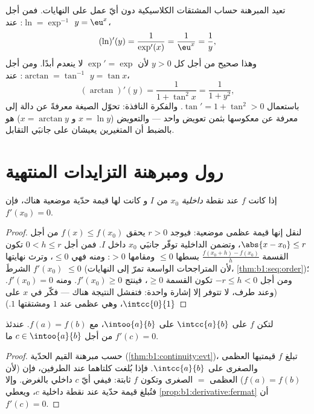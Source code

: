 \begin{example}\label{ex:b1:derivative:inverseaction}
تعيد المبرهنة حساب المشتقات الكلاسيكية دون أيّ عمل على
النهايات. فمن أجل $\ln = \exp^{-1}$: عند $y = \eu^x$،
\[
(\ln)'(y) = \frac{1}{\exp'(x)} = \frac{1}{\eu^{x}} = \frac1y ,
\]
وهذا صحيح من أجل كل $y > 0$ لأن $\exp' = \exp$ لا ينعدم أبدًا. ومن أجل
$\arctan = \tan^{-1}$: عند $y = \tan x$،
\[
(\arctan)'(y) = \frac{1}{1 + \tan^2 x} = \frac{1}{1 + y^2} ,
\]
باستعمال $\tan' = 1 + \tan^2 > 0$. والفكرة النافذة: تحوّل الصيغة
معرفةً عن دالة إلى معرفة عن
معكوسها بثمن تعويض واحد --- والتعويض
($x = \ln y$ و $x = \arctan y$) هو بالضبط
 أن المتغيرين يعيشان على جانبَي
التقابل.
\end{example}

\section{رول ومبرهنة التزايدات المنتهية}

\begin{proposition}\label{prop:b1:derivative:fermat}
إذا كانت $f$  عند نقطة \emph{داخلية} $x_0$ من $I$ و
كانت لها قيمة حدّية موضعية هناك، فإن $f'(x_0) = 0$.
\end{proposition}

\begin{proof}
لنقل إنها قيمة عظمى موضعية: فيوجد $r > 0$ يحقق $f(x) \leq f(x_0)$
من أجل $\abs{x - x_0} \leq r$، وتضمن الداخلية توفّر
جانبَي $x_0$ داخل $I$. فمن أجل $0 < h \leq r$ تكون
القسمة $\frac{f(x_0 + h) - f(x_0)}{h}$ بسطها $\leq 0$
ومقامها $> 0$: ومنه فهي $\leq 0$، وترث نهايتها $f'(x_0)$
الشرطَ $\leq 0$ (لأن المتراجحات الواسعة تمرّ إلى النهايات،
\cref{thm:b1:seq:order})؛ ومن أجل $-r \leq h < 0$ تكون القسمة
$\geq 0$، فينتج $f'(x_0) \geq 0$. ومنه $f'(x_0) = 0$. (وعند
طرف، لا تتوفر إلا إشارة واحدة: فتفشل النتيجة هناك ---
فكّر في $x$ على $\intcc{0}{1}$، وهي عظمى عند $1$ ومشتقتها
$1$.)
\end{proof}

\begin{theorem}[رول]\label{thm:b1:derivative:rolle}
لتكن $f$  على $\intcc{a}{b}$  على
$\intoo{a}{b}$، مع $f(a) = f(b)$. عندئذ $f'(c) = 0$ من أجل $c \in
\intoo{a}{b}$ ما.
\end{theorem}

\begin{proof}
حسب مبرهنة القيم الحدّية (\cref{thm:b1:continuity:evt})، تبلغ $f$
قيمتيها العظمى والصغرى على $\intcc{a}{b}$. فإذا بُلغت كلتاهما
عند الطرفين، فإن (لأن $f(a) = f(b)$) العظمى $=$ الصغرى وتكون $f$
ثابتة: فيفي أيّ $c$ داخلي بالغرض. وإلا فتُبلغ قيمة حدّية
عند نقطة داخلية $c$، ويعطي
\cref{prop:b1:derivative:fermat} أن $f'(c) = 0$.
\end{proof}

